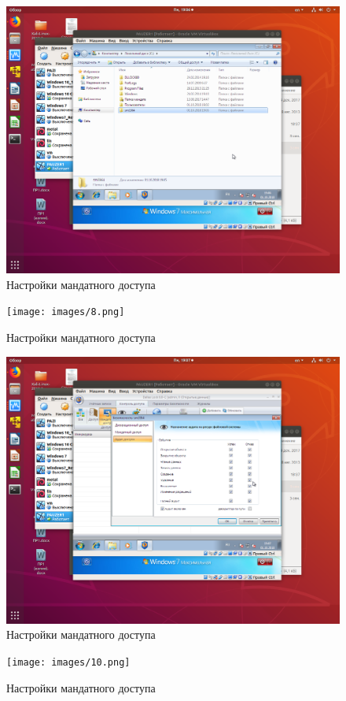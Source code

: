 \begin{figure}[H]
	\centering
	\includegraphics[width=.8\textwidth]{images/7.png}
	\caption{Настройки мандатного доступа}
\end{figure}

\begin{figure}[H]
	\centering
	\texttt{[image: images/8.png]}
	\caption{Настройки мандатного доступа}
\end{figure}

\begin{figure}[H]
	\centering
	\includegraphics[width=.8\textwidth]{images/9.png}
	\caption{Настройки мандатного доступа}
\end{figure}

\begin{figure}[H]
	\centering
	\texttt{[image: images/10.png]}
	\caption{Настройки мандатного доступа}
\end{figure}

